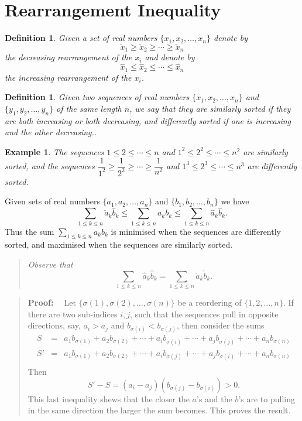 \documentclass[11pt, openany]{book}
\theoremstyle{change} \theoremheaderfont{\blue\sffamily\bfseries}
\newtheorem{exa}[thm]{Example}
\newtheorem{df}[thm]{Definition}
\newcommand{\proofsymbol}{\Pisymbol{pzd}{113}}
\theoremstyle{nonumberplain} \theoremheaderfont{\sffamily\bfseries}
\newenvironment{pf}[0]{\itshape\begin{quote}{\bf Proof: \ }}{\proofsymbol\end{quote}}
\newenvironment{rem}[0]{\begin{quote}{\huge\textcolor{red}{\Pisymbol{pzd}{43}}}\itshape }{\end{quote}}
\newcommand{\í}{\'{\i}}
\begin{document}
\section{Rearrangement Inequality}

\begin{df}
Given a set of real numbers $\{x_1, x_2, \ldots , x_n\}$ denote by
$$\check{x}_1\geq  \check{x}_2\geq  \cdots \geq \check{x}_n$$ the
decreasing rearrangement of the $x_i$ and denote by
$$\hat{x}_1\leq  \hat{x}_2\leq  \cdots \leq \hat{x}_n$$the
increasing rearrangement of the $x_i$.
\end{df}
\begin{df}
Given two sequences  of real numbers $\{x_1, x_2, \ldots , x_n\}$
and $\{y_1, y_2, \ldots , y_n\}$ of the same length $n$, we say that
they are {\em similarly sorted} if they are both increasing or both
decreasing, and {\em differently sorted} if one is increasing and
the other decreasing..
\end{df}
\begin{exa}
The sequences $1 \leq 2 \leq \cdots \leq n$ and $1^2 \leq 2^2 \leq
\cdots \leq n^2$ are similarly sorted, and the sequences
$\dfrac{1}{1^2} \geq \dfrac{1}{2^2} \geq \cdots \geq \dfrac{1}{n^2}$
and $1^3 \leq 2^3 \leq \cdots \leq n^3$ are differently sorted.
\end{exa}
\begin{thm}\label{thm:rearrangement-ineq}
Given sets of real numbers $\{a_1, a_2, \ldots , a_n\}$ and $\{b_1,
b_2, \ldots , b_n\}$ we have $$ \sum _{1\leq k\leq
n}\check{a}_k\hat{b}_k \leq \sum _{1\leq k \leq n} a_kb_k \leq \sum
_{1\leq k \leq n}\hat{a}_k\hat{b}_k.
$$Thus the sum $ \sum _{1\leq k \leq n} a_kb_k $ is minimised when
the sequences are differently sorted, and maximised when the
sequences are similarly sorted.
\end{thm}
\begin{rem}
Observe that $$\sum _{1\leq k \leq n}\hat{a}_k\hat{b}_k = \sum
_{1\leq k \leq n}\check{a}_k\check{b}_k.  $$
\end{rem}
\begin{pf}
Let $\{\sigma (1),\sigma(2), \ldots , \sigma(n)\}$ be a reordering
of $\{1,2, \ldots , n\}$. If there are two sub-indices   $i, j$,
such that the sequences pull in opposite directions, say, $a_i
>a_j$ and $b_{\sigma (i)}< b_{\sigma (j)}$, then consider the sums
$$ \begin{array}{lll}S & = & a_1b_{\sigma (1)}+a_2b_{\sigma (2)}+\cdots +a_ib_{\sigma (i)}+\cdots +a_jb_{\sigma (j)}+\cdots + a_nb_{\sigma (n)}\\
S' & = & a_1b_{\sigma (1)}+a_2b_{\sigma (2)}+\cdots +a_ib_{\sigma (j)}+\cdots +a_jb_{\sigma (i)}+\cdots + a_nb_{\sigma (n)}\\
 \end{array}$$
 Then $$ S'-S = (a_i-a_j)(b_{\sigma(j)}-b_{\sigma (i)}) >0. $$This
 last inequality shews that  the closer the $a$'s and the $b$'s are to pulling in the same direction the larger the sum
 becomes. This proves the result.
\end{pf}
\end{document}
